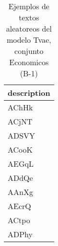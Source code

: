 \begin{table}[H]
\centering
\fontsize{8}{14}\selectfont
\caption{Ejemplos de textos aleatoreos del modelo Tvae, conjunto Economicos (B-1)}
\label{table-sample10-economicos-b-1-tvae-text}
\begin{tabular}{|m{50em}|}
\hline
\rowcolor[gray]{0.8}
description \\
\hline AChHk \\
\hline ACjNT \\
\hline ADSVY \\
\hline ACooK \\
\hline AEGqL \\
\hline ADdQe \\
\hline AAnXg \\
\hline AEcrQ \\
\hline ACtpo \\
\hline ADPhy \\
\hline
\end{tabular}
\end{table}
